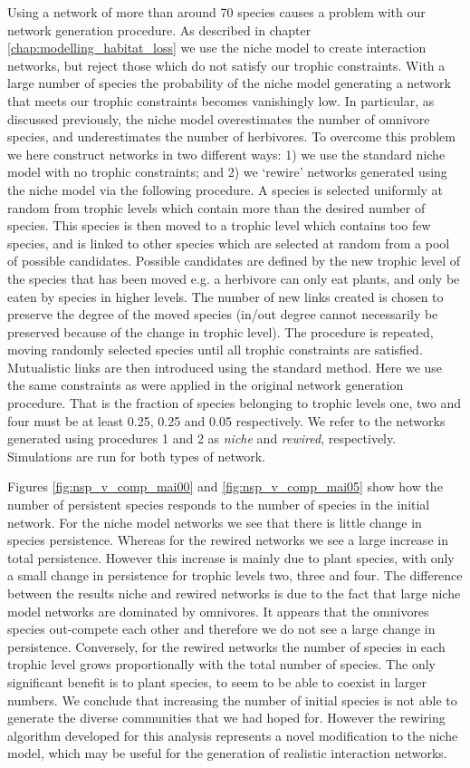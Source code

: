 Using a network of more than around 70 species causes a problem with our network generation procedure. As described in chapter \ref{chap:modelling_habitat_loss} we use the niche model to create interaction networks, but reject those which do not satisfy our trophic constraints. With a large number of species the probability of the niche model generating a network that meets our trophic constraints becomes vanishingly low. In particular, as discussed previously, the niche model overestimates the number of omnivore species, and underestimates the number of herbivores. To overcome this problem we here construct networks in two different ways: 1) we use the standard niche model with no trophic constraints; and 2) we `rewire' networks generated using the niche model via the following procedure. A species is selected uniformly at random from trophic levels which contain more than the desired number of species. This species is then moved to a trophic level which contains too few species, and is linked to other species which are selected at random from a pool of possible candidates. Possible candidates are defined by the new trophic level of the species that has been moved e.g. a herbivore can only eat plants, and only be eaten by species in higher levels. The number of new links created is chosen to preserve the degree of the moved species (in/out degree cannot necessarily be preserved because of the change in trophic level). The procedure is repeated, moving randomly selected species until all trophic constraints are satisfied. Mutualistic links are then introduced using the standard method. Here we use the same constraints as were applied in the original network generation procedure. That is the fraction of species belonging to trophic levels one, two and four must be at least 0.25, 0.25 and 0.05 respectively. We refer to the networks generated using procedures 1 and 2 as \emph{niche} and \emph{rewired}, respectively. Simulations are run for both types of network.

Figures \ref{fig:nsp_v_comp_mai00} and \ref{fig:nsp_v_comp_mai05} show how the number of persistent species responds to the number of species in the initial network. For the niche model networks we see that there is little change in species persistence. Whereas for the rewired networks we see a large increase in total persistence. However this increase is mainly due to plant species, with only a small change in persistence for trophic levels two, three and four. The difference between the results niche and rewired  networks is due to the fact that large niche model networks are dominated by omnivores. It appears that the omnivores species out-compete each other and therefore we do not see a large change in persistence. Conversely, for the rewired networks the number of species in each trophic level grows proportionally with the total number of species. The only significant benefit is to plant species, to seem to be able to coexist in larger numbers. We conclude that increasing the number of initial species is not able to generate the diverse communities that we had hoped for. However the rewiring algorithm developed for this analysis represents a novel modification to the niche model, which may be useful for the generation of realistic interaction networks.

